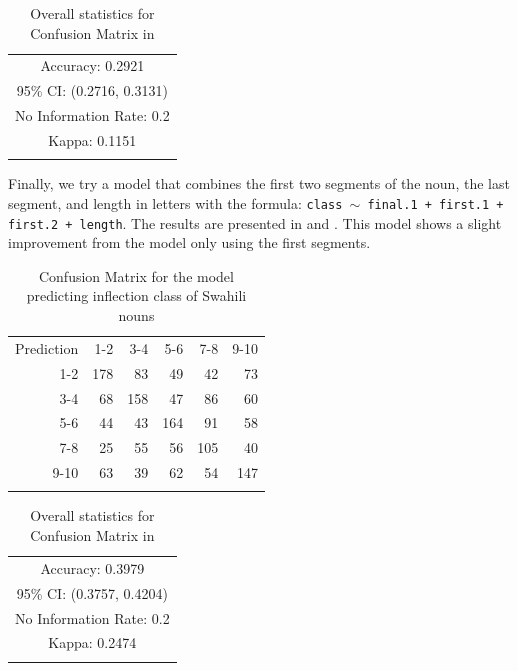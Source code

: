 \begin{table}
  \centering
  \begin{tabular}{lllrrr}
    \lsptoprule
    \multicolumn{6}{c}{Overall statistics:} \\
    \midrule
    \multicolumn{6}{c}{Accuracy: 0.2921}            \\
    \multicolumn{6}{c}{95\% CI: (0.2716, 0.3131)}   \\
    \multicolumn{6}{c}{No Information Rate: 0.2} \\
    \multicolumn{6}{c}{Kappa: 0.1151}               \\
    \lspbottomrule
  \end{tabular}
  \caption{Overall statistics for Confusion Matrix in }\label{tab:class-swa-last-stats}
\end{table}

Finally, we try a model that combines the first two segments of the noun, the last segment, and length in letters with the formula: \texttt{class $\sim$ final.1 + first.1 + first.2 + length}. The results are presented in  and . This model shows a slight improvement from the model only using the first segments.

\begin{table}
  \centering
  \begin{tabular}{rrrrrr}
    \lsptoprule
    \multicolumn{6}{c}{Reference}             \\
    \midrule
    Prediction & 1-2 & 3-4 & 5-6 & 7-8 & 9-10 \\
    1-2        & 178 & 83  & 49  & 42  & 73   \\
    3-4        & 68  & 158 & 47  & 86  & 60   \\
    5-6        & 44  & 43  & 164 & 91  & 58   \\
    7-8        & 25  & 55  & 56  & 105 & 40   \\
    9-10       & 63  & 39  & 62  & 54  & 147  \\
    \lspbottomrule
  \end{tabular}
  \caption{Confusion Matrix for the model predicting inflection class of Swahili nouns}\label{tab:class-swa-last-first}
\end{table}

\begin{table}
  \centering
  \begin{tabular}{lllrrr}
    \lsptoprule
    \multicolumn{6}{c}{Overall statistics:} \\
    \midrule
    \multicolumn{6}{c}{Accuracy: 0.3979}            \\
    \multicolumn{6}{c}{95\% CI: (0.3757, 0.4204)}   \\
    \multicolumn{6}{c}{No Information Rate: 0.2} \\
    \multicolumn{6}{c}{Kappa: 0.2474}               \\
    \lspbottomrule
  \end{tabular}
  \caption{Overall statistics for Confusion Matrix in }\label{tab:class-swa-last-first-stats}
\end{table}

